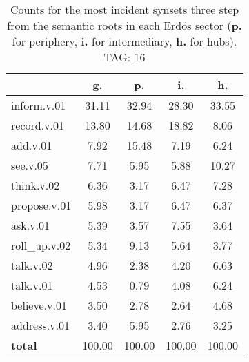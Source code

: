 \begin{table}[h!]
\begin{center}
\begin{tabular}{| l | c | c | c | c |}\hline
 & g. & p. & i. & h. \\\hline
inform.v.01 & 31.11  & 32.94  & 28.30  & 33.55 \\\hline
record.v.01 & 13.80  & 14.68  & 18.82  & 8.06 \\\hline
add.v.01 & 7.92  & 15.48  & 7.19  & 6.24 \\\hline
see.v.05 & 7.71  & 5.95  & 5.88  & 10.27 \\\hline
think.v.02 & 6.36  & 3.17  & 6.47  & 7.28 \\\hline
propose.v.01 & 5.98  & 3.17  & 6.47  & 6.37 \\\hline
ask.v.01 & 5.39  & 3.57  & 7.55  & 3.64 \\\hline
roll\_up.v.02 & 5.34  & 9.13  & 5.64  & 3.77 \\\hline
talk.v.02 & 4.96  & 2.38  & 4.20  & 6.63 \\\hline
talk.v.01 & 4.53  & 0.79  & 4.08  & 6.24 \\\hline
believe.v.01 & 3.50  & 2.78  & 2.64  & 4.68 \\\hline
address.v.01 & 3.40  & 5.95  & 2.76  & 3.25 \\\hline
{{\bf total}} & 100.00  & 100.00  & 100.00  & 100.00 \\\hline
\end{tabular}
\caption{Counts for the most incident synsets three step from the semantic roots in each Erd\"os sector ({\bf p.} for periphery, {\bf i.} for intermediary, {\bf h.} for hubs). TAG: 16}
\end{center}
\end{table}